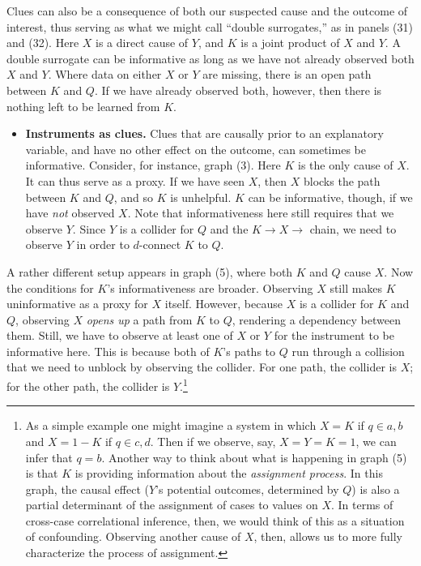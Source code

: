 \documentclass[
  12pt,
]{book}
\providecommand{\tightlist}{%
  \setlength{\itemsep}{0pt}\setlength{\parskip}{0pt}}
\begin{document}
Clues can also be a consequence of both our suspected cause and the outcome of interest, thus serving as what we might call ``double surrogates,'' as in panels (31) and (32). Here \(X\) is a direct cause of \(Y\), and \(K\) is a joint product of \(X\) and \(Y\). A double surrogate can be informative as long as we have not already observed both \(X\) and \(Y\). Where data on either \(X\) or \(Y\) are missing, there is an open path between \(K\) and \(Q\). If we have already observed both, however, then there is nothing left to be learned from \(K\).

\begin{itemize}
\tightlist
\item
  \textbf{Instruments as clues.} Clues that are causally prior to an explanatory variable, and have no other effect on the outcome, can sometimes be informative. Consider, for instance, graph (3). Here \(K\) is the only cause of \(X\). It can thus serve as a proxy. If we have seen \(X\), then \(X\) blocks the path between \(K\) and \(Q\), and so \(K\) is unhelpful. \(K\) can be informative, though, if we have \emph{not} observed \(X\). Note that informativeness here still requires that we observe \(Y\). Since \(Y\) is a collider for \(Q\) and the \(K \rightarrow X \rightarrow\) chain, we need to observe \(Y\) in order to \(d\)-connect \(K\) to \(Q\).
\end{itemize}

A rather different setup appears in graph (5), where both \(K\) and \(Q\) cause \(X\). Now the conditions for \(K\)'s informativeness are broader. Observing \(X\) still makes \(K\) uninformative as a proxy for \(X\) itself. However, because \(X\) is a collider for \(K\) and \(Q\), observing \(X\) \emph{opens up} a path from \(K\) to \(Q\), rendering a dependency between them. Still, we have to observe at least one of \(X\) or \(Y\) for the instrument to be informative here. This is because both of \(K\)'s paths to \(Q\) run through a collision that we need to unblock by observing the collider. For one path, the collider is \(X\); for the other path, the collider is \(Y\).\footnote{As a simple example one might imagine a system in which \(X = K\) if \(q \in {a,b}\) and \(X = 1-K\) if \(q \in {c,d}\). Then if we observe, say, \(X=Y=K=1\), we can infer that \(q = b\). Another way to think about what is happening in graph (5) is that \(K\) is providing information about the \emph{assignment process}. In this graph, the causal effect (\(Y\)'s potential outcomes, determined by \(Q\)) is also a partial determinant of the assignment of cases to values on \(X\). In terms of cross-case correlational inference, then, we would think of this as a situation of confounding. Observing another cause of \(X\), then, allows us to more fully characterize the process of assignment.}
\end{document}
